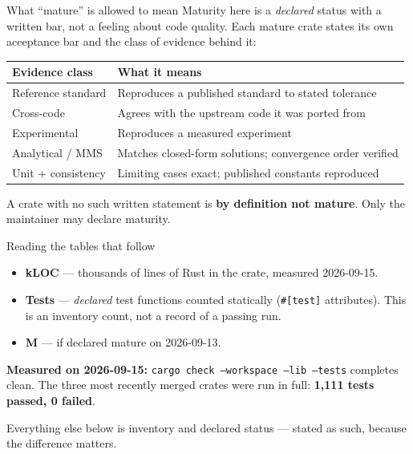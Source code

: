 \documentclass[aspectratio=169]{beamer}
\newcommand{\statustab}[1]{{\footnotesize\setlength{\tabcolsep}{4pt}#1}}
\begin{document}
\begin{frame}{What ``mature'' is allowed to mean}
    Maturity here is a \emph{declared} status with a written bar, not a feeling
    about code quality. Each mature crate states its own acceptance bar and the
    class of evidence behind it:

    \medskip
    \statustab{
    \begin{tabular}{ll}
        \toprule
        \textbf{Evidence class} & \textbf{What it means} \\
        \midrule
        Reference standard & Reproduces a published standard to stated tolerance \\
        Cross-code         & Agrees with the upstream code it was ported from \\
        Experimental       & Reproduces a measured experiment \\
        Analytical / MMS   & Matches closed-form solutions; convergence order verified \\
        Unit + consistency & Limiting cases exact; published constants reproduced \\
        \bottomrule
    \end{tabular}}

    \medskip
    A crate with no such written statement is \textbf{by definition not mature}.
    Only the maintainer may declare maturity.
\end{frame}

\begin{frame}{Reading the tables that follow}
    \begin{itemize}
        \item \textbf{kLOC} --- thousands of lines of Rust in the crate,
              measured 2026-09-15.
        \item \textbf{Tests} --- \emph{declared} test functions counted
              statically (\texttt{\#[test]} attributes). This is an inventory
              count, not a record of a passing run.
        \item \textbf{M} --- \checkmark{} if declared mature on 2026-09-13.
    \end{itemize}

    \medskip
    \textbf{Measured on 2026-09-15:} \texttt{cargo check --workspace --lib
    --tests} completes clean. The three most recently merged crates were run in
    full: \textbf{1{,}111 tests passed, 0 failed}.

    \medskip
    Everything else below is inventory and declared status --- stated as such,
    because the difference matters.
\end{frame}
\end{document}
